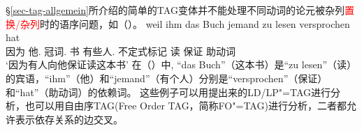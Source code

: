 \S \ref{sec-tag-allgemein}所介绍的简单的TAG变体并不能处理不同动词的论元被杂列\textcolor{red}{置换/杂列}时的语序问题，如（）。
\ea
\label{ex-weil-ihm-das-Buch-jemand-zu-lesen-versprochen-hat-drei}
\gll weil    ihm das Buch jemand   zu lesen versprochen hat\footnotemark\\
     因为 他.\dat{} 冠词.\acc{} 书 有些人.\nom{} 不定式标记 读 保证 助动词 \\
\glt `因为有人向他保证读这本书'
\z
在（）中, ``{das Buch}''（这本书）是``{zu lesen}''（读）的宾语，``{ihm}''（他）和``{jemand}''（有个人）分别是``{versprochen}''（保证）和``{hat}''（助动词）的依赖词。
这些例子可以用\citet{Joshi87b}提出来的LD/LP"=TAG进行分析，也可以用自由序TAG(Free Order TAG，简称FO"=TAG)\citep*[]{BJR91a}进行分析，二者都允许表示依存关系的边交叉。


